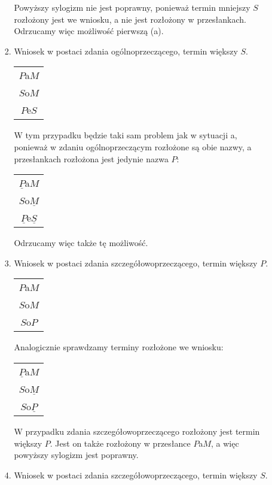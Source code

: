 \documentclass[12pt]{article}
\begin{document}
\begin{itemize}
\begin{enumerate}
\begin{enumerate}
	Powyższy sylogizm nie jest poprawny, ponieważ termin mniejszy $S$ rozłożony jest we wniosku, a nie jest rozłożony w przesłankach. Odrzucamy więc możliwość pierwszą (a).
	\item Wniosek w postaci zdania ogólnoprzeczącego, termin większy $S$. \\
	\begin{center}
		
		\begin{tabular}{c}
			$P$a$M$ \\ 
			$S$o$M$ \\ 
			\hline 
			$P$e$S$ \\ 
		\end{tabular} 
	\end{center}
	
	W tym przypadku będzie taki sam problem jak w sytuacji a, ponieważ w zdaniu ogólnoprzeczącym rozłożone są obie nazwy, a przesłankach rozłożona jest jedynie nazwa $P$:
	\begin{center}
		
		\begin{tabular}{c}
			$\underline{P}$a$M$ \\ 
			$S$o$\underline{M}$ \\ 
			\hline 
			$\underline{P}$e$\underline{S}$ \\ 
		\end{tabular} 
	\end{center}
	Odrzucamy więc także tę możliwość.
		\item Wniosek w postaci zdania szczegółowoprzeczącego, termin większy $P$. \\
		\begin{center}
			
			\begin{tabular}{c}
				$P$a$M$ \\ 
				$S$o$M$ \\ 
				\hline 
				$S$o$P$ 
			\end{tabular} 
		\end{center}
	Analogicznie sprawdzamy terminy rozłożone we wniosku:
	\begin{center}
	\begin{tabular}{c}
			$\underline{P}$a$M$ \\ 
		$S$o$\underline{M}$ \\ 
		\hline 
		$S$o$\underline{P}$ 
	\end{tabular} 
\end{center}
W przypadku zdania szczegółowoprzeczącego rozłożony jest termin większy $P$. Jest on także rozłożony w przesłance $P$a$M$, a więc powyższy sylogizm jest poprawny.
\item Wniosek w postaci zdania szczegółowoprzeczącego, termin większy $S$. \\
\begin{center}
	

\end{center}
\end{enumerate}
\end{enumerate}
\end{itemize}
\end{document}
